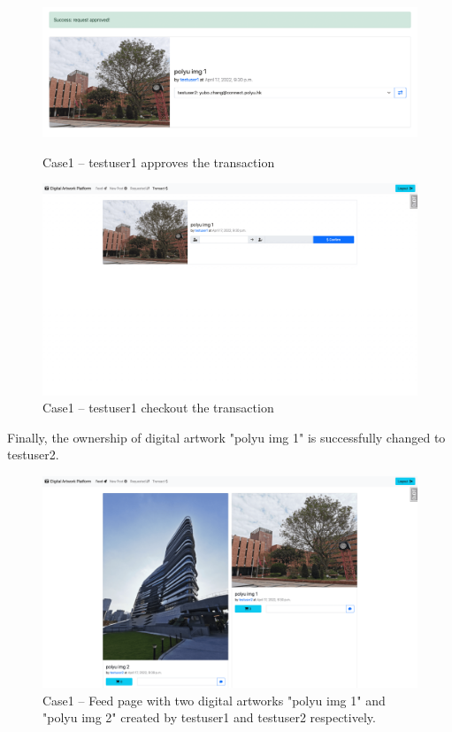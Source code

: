 \begin{figure}[h]
    \centering
    \begin{minipage}{.5\textwidth}
        \centering
        \includegraphics[width=\linewidth, heght=0.6\linewidth]{figures/case1-8.png}
        \caption{Case1 -- testuser1 approves the transaction}
        \label{fig: case1-5}
    \end{minipage}%
    \begin{minipage}{0.5\textwidth}
        \centering
        \includegraphics[width=\linewidth]{figures/case1-9.png}
        \caption{Case1 -- testuser1 checkout the transaction}
        \label{fig: case1-6}
    \end{minipage}
\end{figure}

Finally, the ownership of digital artwork "polyu img 1" is successfully changed to testuser2.
\clearpage

\begin{figure}[!h]
    \centering
    \includegraphics[width=0.75\linewidth]{figures/case1-10.png}
    \caption{Case1 -- Feed page with two digital artworks "polyu img 1" and "polyu img 2" created by testuser1 and testuser2 respectively.}
    \label{fig: case1-5}
\end{figure}

